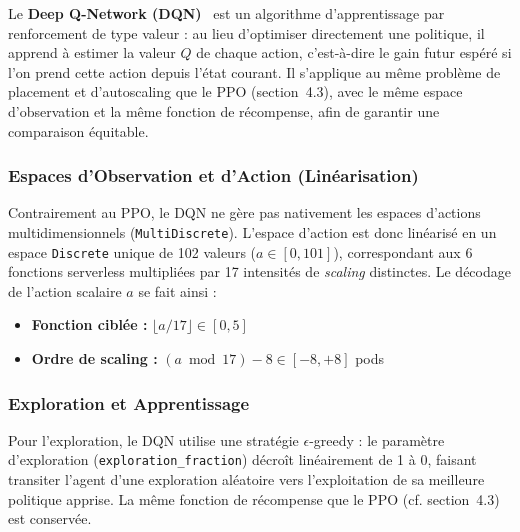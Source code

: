 \label{sec:dqn}

Le \textbf{Deep Q-Network (DQN)}~\cite{mnih2015dqn} est un algorithme d'apprentissage par renforcement de type valeur : au lieu d'optimiser directement une politique, il apprend à estimer la valeur $Q$ de chaque action, c'est-à-dire le gain futur espéré si l'on prend cette action depuis l'état courant. Il s'applique au même problème de placement et d'autoscaling que le PPO (section~4.3), avec le même espace d'observation et la même fonction de récompense, afin de garantir une comparaison équitable.

\subsubsection{Espaces d'Observation et d'Action (Linéarisation)}
Contrairement au PPO, le DQN ne gère pas nativement les espaces d'actions multidimensionnels (\texttt{MultiDiscrete}). L'espace d'action est donc linéarisé en un espace \texttt{Discrete} unique de 102 valeurs ($a \in [0, 101]$), correspondant aux 6 fonctions serverless multipliées par 17 intensités de \textit{scaling} distinctes. Le décodage de l'action scalaire $a$ se fait ainsi :
\begin{itemize}
    \item \textbf{Fonction ciblée :} $\lfloor a / 17 \rfloor \in [0, 5]$
    \item \textbf{Ordre de scaling :} $(a \bmod 17) - 8 \in [-8, +8]$ pods
\end{itemize}

\subsubsection{Exploration et Apprentissage}
Pour l'exploration, le DQN utilise une stratégie $\epsilon$-greedy : le paramètre d'exploration (\texttt{exploration\_fraction}) décroît linéairement de 1 à 0, faisant transiter l'agent d'une exploration aléatoire vers l'exploitation de sa meilleure politique apprise. La même fonction de récompense que le PPO (cf. section~4.3) est conservée.
